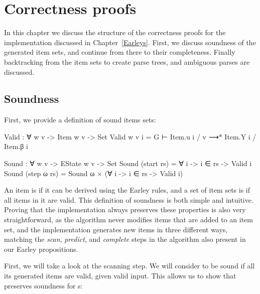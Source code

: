 
\chapter{Correctness proofs} \label{Correctness}

	In this chapter we discuss the structure of the correctness proofs for the
	implementation discussed in Chapter~\ref{Earleys}. First, we discuss
	soundness of the generated item sets, and continue from there to their
	completeness. Finally backtracking from the item sets to create parse
	trees, and ambiguous parses are discussed.

	\section{Soundness}

		First, we provide a definition of sound items sets:

		\begin{code}
			Valid : ∀ {w v} -> Item w v -> Set
			Valid {w} {v} i = G ⊢ Item.u i / v ⟶* Item.Y i / Item.β i

			Sound : ∀ {w v} -> EState w v -> Set
			Sound (start rs) = ∀ {i} -> i ∈ rs -> Valid i
			Sound (step ω rs) = Sound ω × (∀ {i} -> i ∈ rs -> Valid i)
		\end{code}

		An item is  if it can be derived using the Earley rules,
		and a set of item sets is  if all items in it are valid.
		This definition of soundness is both simple and intuitive. Proving that
		the implementation always preserves these properties is also very
		straightforward, as the algorithm never modifies items that are added
		to an item set, and the implementation generates new items in three
		different ways, matching the \emph{scan}, \emph{predict}, and
		\emph{complete} steps in the algorithm also present in our Earley
		propositions.

		First, we will take a look at the scanning step. We will consider
		 to be sound if all its generated items are valid, given
		valid input. This allows us to show that  preserves
		soundness for s:

